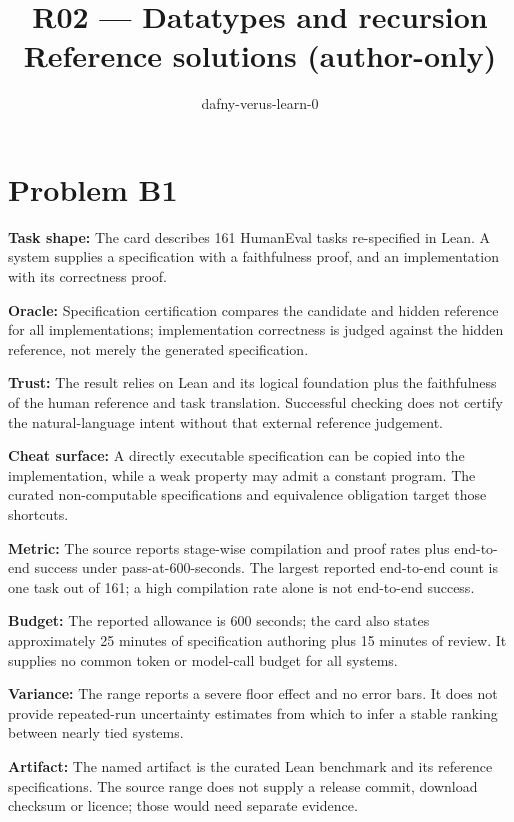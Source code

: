 \documentclass[11pt]{article}
\title{R02 --- Datatypes and recursion \\ \large Reference solutions (author-only)}
\author{dafny-verus-learn-0}
\date{}
\begin{document}
\maketitle
\section*{Problem B1}\label{ans:B1}
\begin{answer}
\textbf{Task shape:} The card describes 161 HumanEval tasks re-specified in Lean. A system supplies a specification with a faithfulness proof, and an implementation with its correctness proof.

\textbf{Oracle:} Specification certification compares the candidate and hidden reference for all implementations; implementation correctness is judged against the hidden reference, not merely the generated specification.

\textbf{Trust:} The result relies on Lean and its logical foundation plus the faithfulness of the human reference and task translation. Successful checking does not certify the natural-language intent without that external reference judgement.

\textbf{Cheat surface:} A directly executable specification can be copied into the implementation, while a weak property may admit a constant program. The curated non-computable specifications and equivalence obligation target those shortcuts.

\textbf{Metric:} The source reports stage-wise compilation and proof rates plus end-to-end success under pass-at-600-seconds. The largest reported end-to-end count is one task out of 161; a high compilation rate alone is not end-to-end success.

\textbf{Budget:} The reported allowance is 600 seconds; the card also states approximately 25 minutes of specification authoring plus 15 minutes of review. It supplies no common token or model-call budget for all systems.

\textbf{Variance:} The range reports a severe floor effect and no error bars. It does not provide repeated-run uncertainty estimates from which to infer a stable ranking between nearly tied systems.

\textbf{Artifact:} The named artifact is the curated Lean benchmark and its reference specifications. The source range does not supply a release commit, download checksum or licence; those would need separate evidence.
\end{answer}
\end{document}
